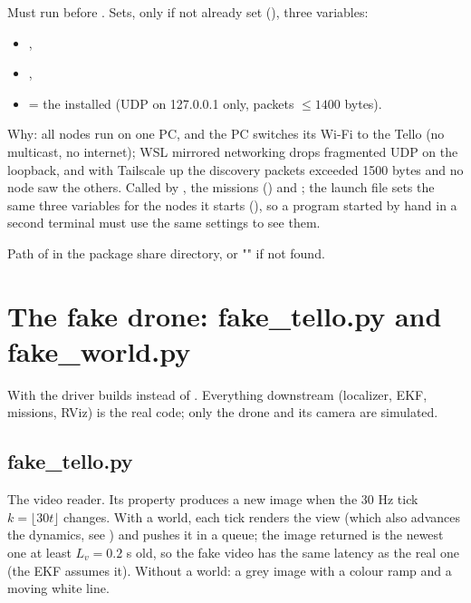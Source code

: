 Must run before . Sets, only if not already set (), three variables:
\begin{itemize}[itemsep=0pt]
\item {},
\item {},
\item {} = the installed  (UDP on
127.0.0.1 only, packets $\le1400$ bytes).
\end{itemize} Why: all nodes run on one PC, and the PC switches its Wi-Fi to the Tello (no multicast,
no internet); WSL mirrored networking drops fragmented UDP on the loopback, and with Tailscale up the discovery
packets exceeded 1500 bytes and no node saw the others. Called by , the missions
() and ; the launch file sets the same three variables for the nodes it
starts (), so a program started by hand in a second terminal must use the same settings to
see them.

Path of  in the package share directory, or "" if not found.

\section{The fake drone: fake\_tello.py and fake\_world.py}
\label{sec:fake}

With  the driver builds  instead of . Everything downstream
(localizer, EKF, missions, RViz) is the real code; only the drone and its camera are simulated.

\subsection{fake\_tello.py}

The video reader. Its  property produces a new image when the 30 Hz tick $k=\lfloor 30t\rfloor$ changes.
With a world, each tick renders the view (which also advances the dynamics, see ) and pushes it in a
queue; the image returned is the newest one at least $L_v=0.2$ s old, so the fake video has the same latency as the
real one (the EKF assumes it). Without a world: a grey image with a colour ramp and a moving white line.

